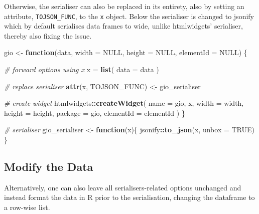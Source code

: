 \documentclass[
  10pt,
]{krantz}
\makeatletter
\newenvironment{Shaded}{\begin{snugshade}}{\end{snugshade}}
\newcommand{\CommentTok}[1]{\textcolor[rgb]{0.37,0.37,0.37}{\textit{#1}}}
\newcommand{\ControlFlowTok}[1]{\textcolor[rgb]{0.27,0.27,0.27}{\textbf{#1}}}
\newcommand{\DataTypeTok}[1]{\textcolor[rgb]{0.27,0.27,0.27}{#1}}
\newcommand{\KeywordTok}[1]{\textcolor[rgb]{0.27,0.27,0.27}{\textbf{#1}}}
\newcommand{\NormalTok}[1]{#1}
\newcommand{\OperatorTok}[1]{\textcolor[rgb]{0.43,0.43,0.43}{\textbf{#1}}}
\newcommand{\OtherTok}[1]{\textcolor[rgb]{0.37,0.37,0.37}{#1}}
\newcommand{\StringTok}[1]{\textcolor[rgb]{0.5,0.5,0.5}{#1}}
\newenvironment{kframe}{%
\medskip{}
\setlength{\fboxsep}{.8em}
 \def\at@end@of@kframe{}%
 \ifinner\ifhmode%
  \def\at@end@of@kframe{\end{minipage}}%
  \begin{minipage}{\columnwidth}%
 \fi\fi%
 \def\FrameCommand##1{\hskip\@totalleftmargin \hskip-\fboxsep
 \colorbox{shadecolor}{##1}\hskip-\fboxsep
     \hskip-\linewidth \hskip-\@totalleftmargin \hskip\columnwidth}%
 \MakeFramed {\advance\hsize-\width
   \@totalleftmargin\z@ \linewidth\hsize
   \@setminipage}}%
 {\par\unskip\endMakeFramed%
 \at@end@of@kframe}
\renewenvironment{Shaded}{\begin{kframe}}{\end{kframe}}
\makeatother
\begin{document}
Otherwise, the serialiser can also be replaced in its entirety, also by setting an attribute, \texttt{TOJSON\_FUNC}, to the \texttt{x} object. Below the serialiser is changed to jsonify \citep{R-jsonify} which by default serialises data frames to wide, unlike htmlwidgets' serialiser, thereby also fixing the issue.

\begin{Shaded}
\begin{Highlighting}[]
\NormalTok{gio <{-}}\StringTok{ }\ControlFlowTok{function}\NormalTok{(data, }\DataTypeTok{width =} \OtherTok{NULL}\NormalTok{, }\DataTypeTok{height =} \OtherTok{NULL}\NormalTok{, }
  \DataTypeTok{elementId =} \OtherTok{NULL}\NormalTok{) \{}

  \CommentTok{\# forward options using x}
\NormalTok{  x =}\StringTok{ }\KeywordTok{list}\NormalTok{(}
    \DataTypeTok{data =}\NormalTok{ data}
\NormalTok{  )}

  \CommentTok{\# replace serialiser}
  \KeywordTok{attr}\NormalTok{(x, }\StringTok{\textquotesingle{}TOJSON\_FUNC\textquotesingle{}}\NormalTok{) <{-}}\StringTok{ }\NormalTok{gio\_serialiser}

  \CommentTok{\# create widget}
\NormalTok{  htmlwidgets}\OperatorTok{::}\KeywordTok{createWidget}\NormalTok{(}
    \DataTypeTok{name =} \StringTok{\textquotesingle{}gio\textquotesingle{}}\NormalTok{,}
\NormalTok{    x,}
    \DataTypeTok{width =}\NormalTok{ width,}
    \DataTypeTok{height =}\NormalTok{ height,}
    \DataTypeTok{package =} \StringTok{\textquotesingle{}gio\textquotesingle{}}\NormalTok{,}
    \DataTypeTok{elementId =}\NormalTok{ elementId}
\NormalTok{  )}
\NormalTok{\}}

\CommentTok{\# serialiser}
\NormalTok{gio\_serialiser <{-}}\StringTok{ }\ControlFlowTok{function}\NormalTok{(x)\{}
\NormalTok{  jsonify}\OperatorTok{::}\KeywordTok{to\_json}\NormalTok{(x, }\DataTypeTok{unbox =} \OtherTok{TRUE}\NormalTok{)}
\NormalTok{\}}
\end{Highlighting}
\end{Shaded}

\hypertarget{widgets-full-transform-data-modify-data}{%
\subsection{Modify the Data}\label{widgets-full-transform-data-modify-data}}

Alternatively, one can also leave all serialisers-related options unchanged and instead format the data in R prior to the serialisation, changing the dataframe to a row-wise list.
\end{document}
